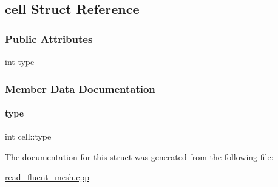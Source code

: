 \hypertarget{structcell}{}\subsection{cell Struct Reference}
\label{structcell}
\subsubsection*{Public Attributes}
\begin{DoxyCompactItemize}
\item 
int \hyperlink{structcell_a8d271074c9068c96ce148c5f8f14ff18}{type}
\end{DoxyCompactItemize}


\subsubsection{Member Data Documentation}
\mbox{\label{structcell_a8d271074c9068c96ce148c5f8f14ff18}} 
\paragraph{\texorpdfstring{type}{type}}
{\footnotesize\ttfamily int cell\+::type}



The documentation for this struct was generated from the following file\+:\begin{DoxyCompactItemize}
\item 
\hyperlink{read__fluent__mesh_8cpp}{read\+\_\+fluent\+\_\+mesh.\+cpp}\end{DoxyCompactItemize}
